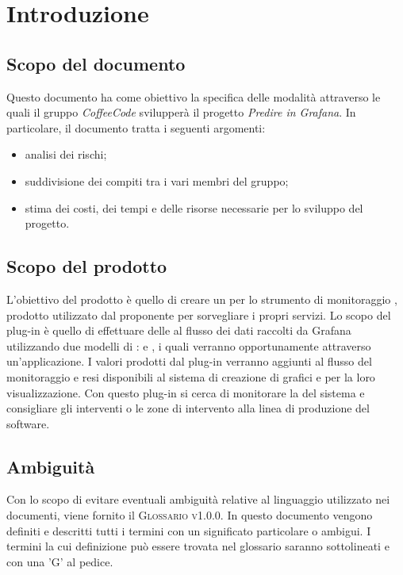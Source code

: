 \documentclass[../piano-di-progetto.tex]{subfiles}
\begin{document}
\section{Introduzione}
\subsection{Scopo del documento}
Questo documento ha come obiettivo la specifica delle modalità attraverso le quali il gruppo \emph{CoffeeCode} svilupperà il progetto \emph{Predire in Grafana}. In particolare, il documento tratta i seguenti argomenti:
\begin{itemize}
  \item analisi dei rischi;
  \item suddivisione dei compiti tra i vari membri del gruppo;
  \item stima dei costi, dei tempi e delle risorse necessarie per lo sviluppo del progetto.
\end{itemize}

\subsection{Scopo del prodotto}
L'obiettivo del prodotto è quello di creare un  per lo strumento di monitoraggio , prodotto utilizzato dal proponente per sorvegliare i propri servizi. Lo scopo del plug-in è quello di effettuare delle  al flusso dei dati raccolti da Grafana utilizzando due modelli di :  e , i quali verranno opportunamente  attraverso un'applicazione. I valori prodotti dal plug-in verranno aggiunti al flusso del monitoraggio e resi disponibili al sistema di creazione di grafici e  per la loro visualizzazione. Con questo plug-in si cerca di monitorare la  del sistema e consigliare gli interventi o le zone di intervento alla linea di produzione del software. 

\subsection{Ambiguità}
Con lo scopo di evitare eventuali ambiguità relative al linguaggio utilizzato nei documenti, viene fornito il \textsc{Glossario v1.0.0}. In questo documento vengono definiti e descritti tutti i termini con un significato particolare o ambigui. I termini la cui definizione può essere trovata nel glossario saranno sottolineati e con una 'G' al pedice.
\end{document}
